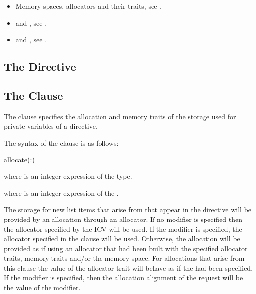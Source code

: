 \crossreferences
\begin{itemize}
\item Memory spaces, allocators and their traits, see .
\item {} and , see .
\item {} and , see .
\end{itemize}

\subsection{The  Directive}
\label{subsec:deallocate Directive}
\summary

\syntax

\descr

\subsection{The  Clause}
\label{subsec:allocate Clause}
\summary
The  clause specifies the allocation and memory traits of the storage used for private variables of a directive.

\syntax

The syntax of the  clause is as follows:

\begin{boxedcode}
allocate(\plc{[allocator}:\plc{] list})
\end{boxedcode}

\ccppspecificstart
\begin{ccppspecific}
where  is an integer expression of the  type.
\end{ccppspecific}
\begin{fortranspecific}
where  is an integer expression of the  .
\end{fortranspecific}

\descr

The storage for new list items that arise from  that appear in the directive will be provided by an allocation through an allocator. If no modifier is specified then the allocator specified by the  ICV will be used. If the  modifier is specified, the allocator specified in the clause will be used. Otherwise, the allocation will be provided as if using an allocator that had been built with the specified allocator traits, memory traits and/or the  memory space. For allocations that arise from this clause the  value of the  allocator trait will behave as if the  had been specified. If the  modifier is specified, then the allocation alignment of the request will be the value of the  modifier.

